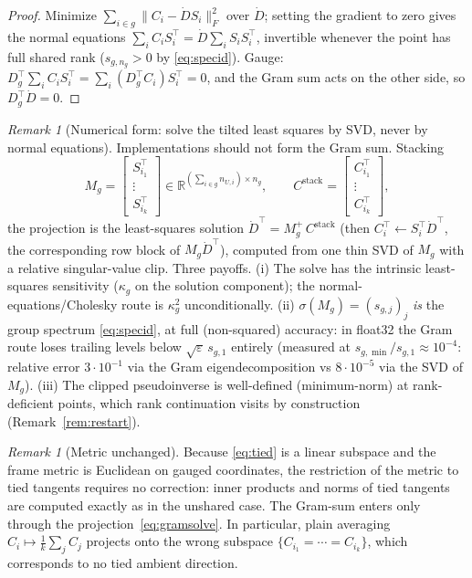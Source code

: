 \documentclass[11pt]{article}
\theoremstyle{definition}
\theoremstyle{remark}
\newtheorem{remark}[theorem]{Remark}
\newcommand{\R}{\mathbb{R}}
\begin{document}
\begin{proof}
Minimize $\sum_{i\in g} \| C_i - \dot D S_i \|_F^2$ over $\dot D$; setting the
gradient to zero gives the normal equations
$\sum_i C_i S_i^\top = \dot D \sum_i S_i S_i^\top$, invertible whenever the
point has full shared rank ($s_{g,n_g} > 0$ by \eqref{eq:specid}). Gauge:
$D_g^\top \sum_i C_i S_i^\top = \sum_i (D_g^\top C_i) S_i^\top = 0$, and the
Gram sum acts on the other side, so $D_g^\top \dot D = 0$.
\end{proof}

\begin{remark}[Numerical form: solve the tilted least squares by SVD, never
by normal equations]\label{rem:svdsolve}
Implementations should not form the Gram sum. Stacking
\[
M_g = \begin{bmatrix} S_{i_1}^\top \\ \vdots \\ S_{i_k}^\top \end{bmatrix}
\in \R^{(\sum_{i\in g} n_{U,i}) \times n_g},
\qquad
C^{\mathrm{stack}} = \begin{bmatrix} C_{i_1}^\top \\ \vdots \\
C_{i_k}^\top \end{bmatrix},
\]
the projection is the least-squares solution
$\dot D^\top = M_g^{+}\, C^{\mathrm{stack}}$ (then
$C_i^\top \leftarrow S_i^\top \dot D^\top$, the corresponding row block of
$M_g \dot D^\top$), computed from one thin SVD of $M_g$ with a relative
singular-value clip. Three payoffs. (i) The solve has the intrinsic
least-squares sensitivity ($\kappa_g$ on the solution component); the
normal-equations/Cholesky route is $\kappa_g^2$ unconditionally.
(ii) $\sigma(M_g) = (s_{g,j})_j$ \emph{is} the group spectrum
\eqref{eq:specid}, at full (non-squared) accuracy: in float32 the Gram route
loses trailing levels below $\sqrt{\varepsilon}\, s_{g,1}$ entirely
(measured at $s_{g,\min}/s_{g,1} \approx 10^{-4}$: relative error
$3\cdot10^{-1}$ via the Gram eigendecomposition vs $8\cdot10^{-5}$ via the
SVD of $M_g$). (iii) The clipped pseudoinverse is well-defined
(minimum-norm) at rank-deficient points, which rank continuation visits by
construction (Remark~\ref{rem:restart}).
\end{remark}

\begin{remark}[Metric unchanged]
Because \eqref{eq:tied} is a linear subspace and the frame metric is
Euclidean on gauged coordinates, the restriction of the metric to tied
tangents requires no correction: inner products and norms of tied tangents
are computed exactly as in the unshared case. The Gram-sum enters only
through the projection~\eqref{eq:gramsolve}. In particular, plain averaging
$C_i \mapsto \frac1k \sum_j C_j$ projects onto the wrong subspace
$\{C_{i_1} = \cdots = C_{i_k}\}$, which corresponds to no tied ambient
direction.
\end{remark}
\end{document}
